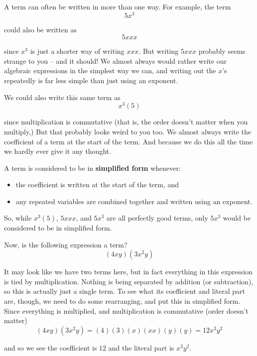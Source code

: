 A term can often be written in more than one way. For example, the term
$$5x^3$$

could also be written as
$$5xxx$$

since $x^3$ is just a shorter way of writing $xxx$. But writing $5xxx$ probably seems strange to you – and it should! We almost always would rather write our algebraic expressions in the simplest way we can, and writing out the $x$’s repeatedly is far less simple than just using an exponent.

We could also write this same term as
$$x^3(5)$$

since multiplication is commutative (that is, the order doesn’t matter when you multiply,) But that probably looks weird to you too. We almost always write the coefficient of a term at the start of the term. And because we do this all the time we hardly ever give it any thought.

A term is considered to be in \textbf{simplified form} whenever:

\begin{itemize}
	\item the coefficient is written at the start of the term, and
	\item any repeated variables are combined together and written using an exponent.
\end{itemize}

So, while $x^3(5)$, $5xxx$, and $5x^3$ are all perfectly good terms, only $5x^3$ would be considered to be in simplified form.

Now, is the following expression a term?
$$(4xy)(3x^2y)$$

It may look like we have two terms here, but in fact everything in this expression is tied by multiplication. Nothing is being separated by addition (or subtraction), so this is actually just a single term. To see what its coefficient and literal part are, though, we need to do some rearranging, and put this in simplified form. Since everything is multiplied, and multiplication is commutative (order doesn’t matter)
$$(4xy)(3x^2y)=(4)(3)(x)(xx)(y)(y)=12x^3y^2$$

and so we see the coefficient is $12$ and the literal part is $x^3y^2$.



